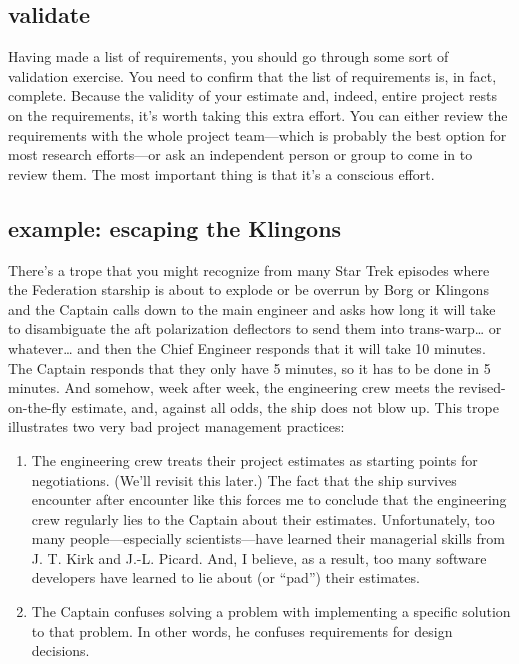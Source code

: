 \documentclass[12pt,oneside]{book}
\begin{document}
\subsection*{validate}
\label{scrivauto:25}

Having made a list of requirements, you should go through some sort of validation exercise. You need to confirm that the list of requirements is, in fact, complete. Because the validity of your estimate and, indeed, entire project rests on the requirements, it's worth taking this extra effort. You can either review the requirements with the whole project team---which is probably the best option for most research efforts---or ask an independent person or group to come in to review them. The most important thing is that it's a conscious effort.

\subsection*{example: escaping the Klingons}
\label{scrivauto:26}

There's a trope that you might recognize from many Star Trek episodes where the Federation starship is about to explode or be overrun by Borg or Klingons and the Captain calls down to the main engineer and asks how long it will take to disambiguate the aft polarization deflectors to send them into trans-warp{\ldots} or whatever{\ldots} and then the Chief Engineer responds that it will take 10 minutes. The Captain responds that they only have 5 minutes, so it has to be done in 5 minutes. And somehow, week after week, the engineering crew meets the revised-on-the-fly estimate, and, against all odds, the ship does not blow up.
This trope illustrates two very bad project management practices:
\begin{enumerate}
\item The engineering crew treats their project estimates as starting points for negotiations. (We'll revisit this later.) The fact that the ship survives encounter after encounter like this forces me to conclude that the engineering crew regularly lies to the Captain about their estimates. Unfortunately, too many people---especially scientists---have learned their managerial skills from J. T. Kirk and J.-L. Picard. And, I believe, as a result, too many software developers have learned to lie about (or ``pad'') their estimates.
\item The Captain confuses solving a problem with implementing a specific solution to that problem. In other words, he confuses requirements for design decisions.
\end{enumerate}
\end{document}
